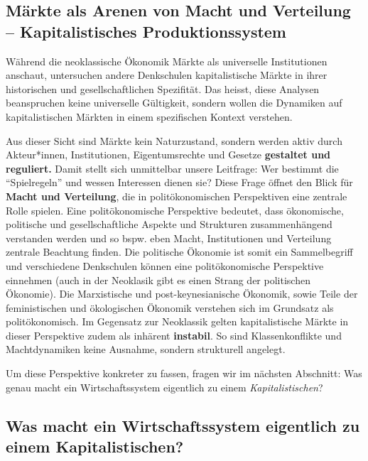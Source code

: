 \documentclass[
  nswissgerman,
  a4paper,
  DIV=11,
  numbers=noendperiod,
  oneside,
  openany]{scrreprt}
\begin{document}
\subsection{Märkte als Arenen von Macht und Verteilung --
Kapitalistisches
Produktionssystem}\label{muxe4rkte-als-arenen-von-macht-und-verteilung-kapitalistisches-produktionssystem}

Während die neoklassische Ökonomik Märkte als universelle Institutionen
anschaut, untersuchen andere Denkschulen kapitalistische Märkte in ihrer
historischen und gesellschaftlichen Spezifität. Das heisst, diese
Analysen beanspruchen keine universelle Gültigkeit, sondern wollen die
Dynamiken auf kapitalistischen Märkten in einem spezifischen Kontext
verstehen.

Aus dieser Sicht sind Märkte kein Naturzustand, sondern werden aktiv
durch Akteur*innen, Institutionen, Eigentumsrechte und Gesetze
\textbf{gestaltet und reguliert.} Damit stellt sich unmittelbar unsere
Leitfrage: Wer bestimmt die ``Spielregeln'' und wessen Interessen dienen
sie? Diese Frage öffnet den Blick für \textbf{Macht und Verteilung}, die
in politökonomischen Perspektiven eine zentrale Rolle spielen. Eine
politökonomische Perspektive bedeutet, dass ökonomische, politische und
gesellschaftliche Aspekte und Strukturen zusammenhängend verstanden
werden und so bspw. eben Macht, Institutionen und Verteilung zentrale
Beachtung finden. Die politische Ökonomie ist somit ein Sammelbegriff
und verschiedene Denkschulen können eine politökonomische Perspektive
einnehmen (auch in der Neoklasik gibt es einen Strang der politischen
Ökonomie). Die Marxistische und post-keynesianische Ökonomik, sowie
Teile der feministischen und ökologischen Ökonomik verstehen sich im
Grundsatz als politökonomisch. Im Gegensatz zur Neoklassik gelten
kapitalistische Märkte in dieser Perspektive zudem als inhärent
\textbf{instabil}. So sind Klassenkonflikte und Machtdynamiken keine
Ausnahme, sondern strukturell angelegt.

Um diese Perspektive konkreter zu fassen, fragen wir im nächsten
Abschnitt: Was genau macht ein Wirtschaftssystem eigentlich zu einem
\emph{Kapitalistischen}?

\subsection{Was macht ein Wirtschaftssystem eigentlich zu einem
Kapitalistischen?}\label{was-macht-ein-wirtschaftssystem-eigentlich-zu-einem-kapitalistischen}
\end{document}
